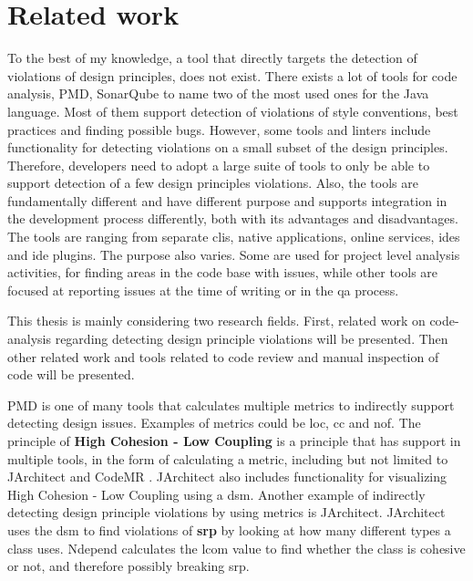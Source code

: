 \documentclass{report}
\begin{document}
\chapter{Related work}
\label{relatedwork}

To the best of my knowledge, a tool that directly targets the detection of violations of design principles, does not exist. There exists a lot of tools for code analysis, PMD\cite{pmd}, SonarQube\cite{sonarqube} to name two of the most used ones for the Java language. Most of them support detection of violations of style conventions, best practices and finding possible bugs. However, some tools and linters include functionality for detecting violations on a small subset of the design principles. Therefore, developers need to adopt a large suite of tools to only be able to support detection of a few design principles violations. Also, the tools are fundamentally different and have different purpose and supports integration in the development process differently, both with its advantages and disadvantages. The tools are ranging from separate \gls{cli}s, native applications, online services, \gls{ide}s and \gls{ide} plugins. The purpose also varies. Some are used for project level analysis activities, for finding areas in the code base with issues, while other tools are focused at reporting issues at the time of writing or in the \gls{qa} process. 

This thesis is mainly considering two research fields. First, related work on code-analysis regarding detecting design principle violations will be presented. Then other related work and tools related to code review and manual inspection of code will be presented.

PMD \cite{pmd} is one of many tools that calculates multiple metrics to indirectly support detecting design issues. Examples of metrics could be \gls{loc}, \gls{cc} and \gls{nof}. The principle of \textbf{High Cohesion - Low Coupling} is a principle that has support in multiple tools, in the form of calculating a metric, including but not limited to JArchitect \cite{jarchitect} and CodeMR \cite{codemr}. JArchitect \cite{jarchitect} also includes functionality for visualizing  High Cohesion - Low Coupling using a \gls{dsm}. Another example of indirectly detecting design principle violations by using metrics is JArchitect. JArchitect uses the \gls{dsm} to find violations of \textbf{\gls{srp}} by looking at how many different types a class uses. Ndepend \cite{ndepend} calculates the \gls{lcom} value to find whether the class is cohesive or not, and therefore possibly breaking \gls{srp}. 
\end{document}
